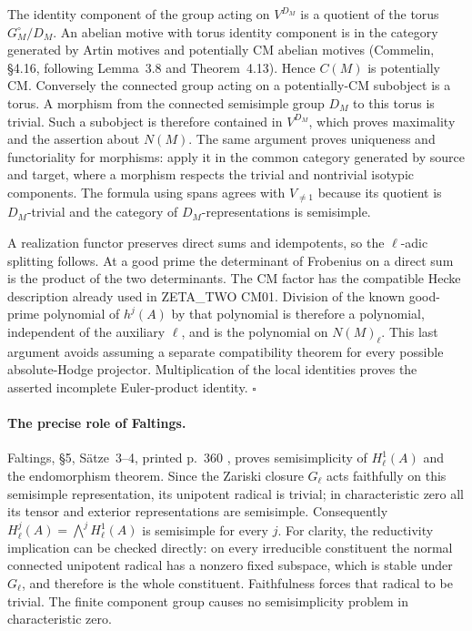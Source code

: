 \documentclass[11pt]{article}
\theoremstyle{remark}
\begin{document}
The identity component of the group acting on $V^{D_M}$ is a quotient
of the torus $G_M^\circ/D_M$.  An abelian motive with torus identity
component is in the category generated by Artin motives and potentially
CM abelian motives (Commelin, \S4.16, following Lemma~3.8 and
Theorem~4.13).  Hence $C(M)$ is potentially CM.  Conversely the connected
group acting on a potentially-CM subobject is a torus.  A morphism from
the connected semisimple group $D_M$ to this torus is trivial.  Such a
subobject is therefore contained in $V^{D_M}$, which proves maximality
and the assertion about $N(M)$.  The same argument proves uniqueness
and functoriality for morphisms: apply it in the common category
generated by source and target, where a morphism respects the trivial
and nontrivial isotypic components.  The formula using spans agrees with
$V_{\ne1}$ because its quotient is $D_M$-trivial and the category of
$D_M$-representations is semisimple.

A realization functor preserves direct sums and idempotents, so the
$\ell$-adic splitting follows.  At a good prime the determinant of
Frobenius on a direct sum is the product of the two determinants.  The
CM factor has the compatible Hecke description already used in
ZETA\_TWO CM01.  Division of the known good-prime polynomial of $h^j(A)$
by that polynomial is therefore a polynomial, independent of the
auxiliary $\ell$, and is the polynomial on $N(M)_\ell$.  This last
argument avoids assuming a separate compatibility theorem for every
possible absolute-Hodge projector.  Multiplication of the local
identities proves the asserted incomplete Euler-product identity.
\hfill$\square$

\paragraph{The precise role of Faltings.}
Faltings, \S5, S\"atze~3--4, printed p.~360 \cite{NGFaltings}, proves semisimplicity of
$H^1_\ell(A)$ and the endomorphism theorem.  Since the Zariski closure
$G_\ell$ acts faithfully on this semisimple representation, its
unipotent radical is trivial; in characteristic zero all its tensor
and exterior representations are semisimple.  Consequently
$H^j_\ell(A)=\bigwedge^jH^1_\ell(A)$ is semisimple for every $j$.
For clarity, the reductivity implication can be checked directly:
on every irreducible constituent the normal connected unipotent
radical has a nonzero fixed subspace, which is stable under $G_\ell$,
and therefore is the whole constituent.  Faithfulness forces that
radical to be trivial.  The finite component group causes no
semisimplicity problem in characteristic zero.
\end{document}
